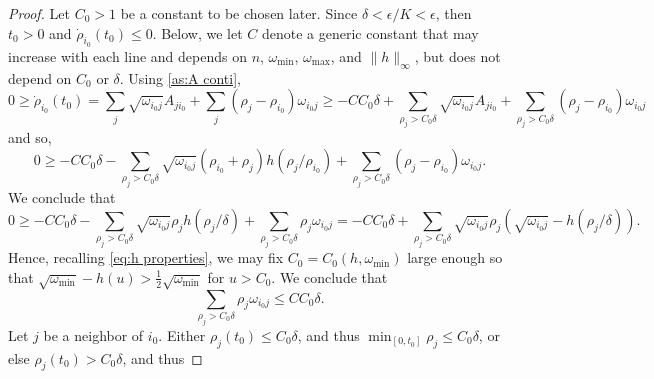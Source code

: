 \documentclass[10pt]{article}
\numberwithin{equation}{section}
\begin{document}
\begin{proof} Let $C_0>1$ be a constant to be chosen later. Since $\delta<\epsilon/K<\epsilon$, then $t_0>0$ and $\dot \rho_{i_0}(t_0)\leq 0$. Below, we let $C$ denote a generic constant that may increase with each line and depends on $n$, $\omega_{\min}$, $\omega_{\max}$, and $\|h\|_{\infty}$, but does not depend on $C_0$ or $\delta$.  Using \eqref{as:A conti},
%
\[
 0\geq\dot \rho_{i_0}(t_0)=\sum_{j} \sqrt{\omega_{i_0j}}A_{j i_0}+\sum_j (\rho_j-\rho_{i_0}) \omega_{i_0j} 
 \geq  -CC_0\delta+\sum_{\rho_j>C_0\delta} \sqrt{\omega_{i_0j}}A_{j i_0}+\sum_{\rho_j>C_0\delta} (\rho_j-\rho_{i_0})\omega_{i_0j}
\]
and so, 
\[
0 \geq -CC_0\delta - \sum_{\rho_j>C_0\delta}\sqrt{\omega_{i_0 j}}(\rho_{i_0}+\rho_{j})h(\rho_j/\rho_{i_0}) +\sum_{\rho_j>C_0\delta} (\rho_j-\rho_{i_0})\omega_{i_0j}.
\]
We conclude that  
\[
0 \geq -CC_0\delta - \sum_{\rho_j>C_0\delta}\sqrt{\omega_{i_0 j}}\rho_{j}h(\rho_j/\delta) +\sum_{\rho_j>C_0\delta} \rho_j\omega_{i_0j}=
-CC_0\delta+\sum_{\rho_j>C_0\delta}\sqrt{\omega_{i_0 j}}\rho_j(\sqrt{\omega_{i_0 j}}-h(\rho_j/\delta)).
\]
 Hence, recalling \eqref{eq:h properties}, we may fix $C_0=C_0(h,\omega_{\min})$ large enough so that $\sqrt{\omega_{\min}}-h(u)>\frac{1}{2}\sqrt{\omega_{\min}}$ for $u>C_0$.
We conclude that 
\begin{equation}\label{eq:dec08.2025.1}
   \sum_{\rho_j>C_0\delta} \rho_j\omega_{i_0j}\leq CC_0\delta.
\end{equation}
Let $j$ be a neighbor of $i_0$. Either $\rho_j(t_0)\leq C_0\delta$, and thus $ \min_{[0,t_0]}\rho_j \leq C_0\delta$, or else $\rho_j(t_0)>C_0\delta$, and thus  

\end{proof}
\end{document}
